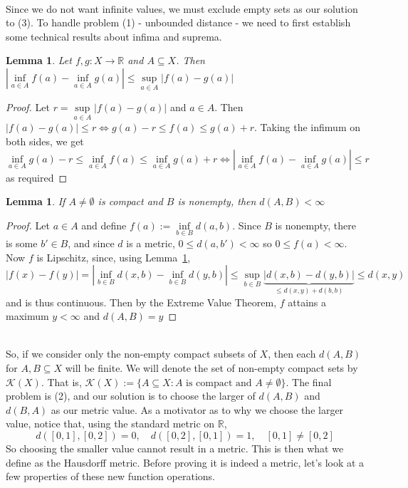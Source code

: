\documentclass{article}
\theoremstyle{plain}
\newtheorem{lem}[thm]{Lemma}
\theoremstyle{definition}
\theoremstyle{remark}
\begin{document}
~\\ Since we do not want infinite values, we must exclude empty sets as our solution to (3). To handle problem (1) - unbounded distance - we need to first establish some technical results about infima and suprema.
\begin{lem}\label{lem:infs}
    Let $f,g: X \to \mathbb{R}$ and $A\subseteq X$. Then $\left |\inf \limits _{a \in A}f(a) - \inf \limits _{a \in A}g(a) \right | \le \sup \limits _{a\in A}\left |f(a) - g(a) \right |$ 
\end{lem}
\begin{proof}
    Let $r = \sup \limits _{a\in A} \left |f(a) - g(a) \right |$ and $a\in A$.  Then $|f(a) - g(a)| \le r \iff g(a)-r\le f(a) \le g(a)+r$. Taking the infimum on both sides, we get $\inf \limits _{a\in A} g(a) - r\le \inf \limits _{a\in A} f(a) \le \inf \limits _{a\in A}g(a)+r \iff \left |\inf \limits _{a\in A}f(a) - \inf \limits _{a\in A}g(a) \right | \le r$ as required
\end{proof}
\begin{lem}\label{lem:well-defined}
    If $A\ne \emptyset$ is compact and $B$ is nonempty, then $d(A,B) < \infty$
\end{lem}
\begin{proof}
    Let $a \in A$ and define $f(a) :=\inf \limits _{b\in B} d(a,b)$. Since $B$ is nonempty, there is some $b' \in B$, and since $d$ is a metric, $0\le d(a,b')<\infty$ so $0\le f(a)<\infty$. Now $f$ is Lipschitz, since, using Lemma~\ref{lem:infs},
    \[|f(x)-f(y)| = \left |\inf \limits _{b \in B}d(x,b) - \inf \limits _{b \in B}d(y,b) \right |\le \sup \limits _{b\in B}\underbrace{|d(x,b) -d(y,b)|} \limits _{\le d(x,y) + d(b,b)} \le d(x,y)\] and is thus continuous. Then by the Extreme Value Theorem, $f$ attains a maximum $y<\infty$ and $d(A,B) = y$
\end{proof}
~\\ So, if we consider only the non-empty compact subsets of $X$, then each $d(A,B)$ for $A,B \subseteq X$ will be finite. We will denote the set of non-empty compact sets by $\mathcal{K}(X)$. That is, $\mathcal{K}(X) := \{A \subseteq X: A \text { is compact and } A\ne \emptyset\}$. The final problem is (2), and our solution is to choose the larger of $d(A,B)$ and $d(B,A)$ as our metric value. As a motivator as to why we choose the larger value, notice that, using the standard metric on $\mathbb{R}$, \[
d \left ([0,1], [0,2] \right ) = 0, \quad d([0,2], [0,1]) = 1, \quad [0,1] \ne [0,2]
\]
So choosing the smaller value cannot result in a metric. This is then what we define as the Hausdorff metric. Before proving it is indeed a metric, let's look at a few properties of these new function operations.
\end{document}
